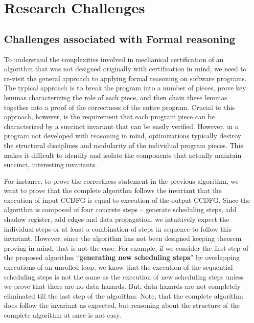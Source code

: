 \chapter{Research Challenges}
\label{sec:challenges}

\section{Challenges associated with Formal reasoning}

To understand the complexities involved in mechanical
certification of an algorithm that was not designed
originally with certification in mind, we need to re-visit
the general approach to applying formal reasoning on
software programs.  The typical approach is to break the
program into a number of pieces, prove key lemmas
characterizing the role of each piece, and then chain these
lemmas together into a proof of the correctness of the
entire program. Crucial to this approach, however, is the
requirement that each program piece can be characterized by
a succinct invariant that can be easily verified.  However,
in a program not developed with reasoning in mind,
optimizations typically destroy the structural disciplines
and modularity of the individual program pieces. This makes it
difficult to identify and isolate the components that
actually maintain succinct, interesting invariants.

For instance, to prove the correctness statement in the previous algorithm, 
we want to prove that the complete algorithm follows
the invariant that the execution of input CCDFG is equal to execution of the output CCDFG.
Since the algorithm is composed of four concrete steps -- generate scheduling steps, add shadow register,
add edges and data propagation, we intuitively expect the individual steps or at least a combination of steps in sequence to
follow this invariant. However, since the algorithm has not been designed keeping theorem proving
in mind, that is not the case. For example, if
we consider the first step of the proposed algorithm ``{\bf generating new scheduling steps}'' by
overlapping executions of an unrolled loop, we know that the execution 
of the sequential scheduling steps is not the same as the execution of new scheduling steps
unless we prove that there are no data hazards. But, data hazards are not completely eliminated till the last step of the algorithm. Note, that the complete algorithm does follow the invariant as expected, but reasoning about the structure of the
complete algorithm at once is not easy.

